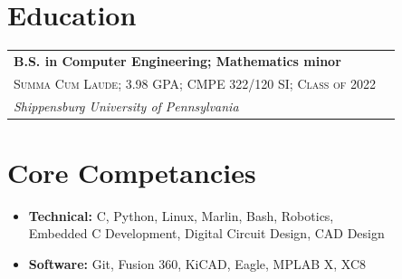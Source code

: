 \documentclass[
	10pt, %
]{FreemanCV}
\begin{document}



\begin{paracol}{2}

\section{Education} 


\begin{supertabular}{l l} %

	
	\textbf{B.S. in Computer Engineering; Mathematics minor}\\ %
	\small\textsc{Summa Cum Laude; 3.98 GPA; CMPE 322/120 SI; Class of 2022}\\ %
	\textit{Shippensburg University of Pennsylvania}\\ %
	

\end{supertabular}

\switchcolumn

\section{Core Competancies}

\begin{itemize}[leftmargin=10pt]
	\itemsep0pt
	\item \textbf{Technical:} C, Python, Linux, Marlin, Bash, Robotics,\\
	\hspace*{0pt}Embedded C Development, Digital Circuit Design, CAD Design
	\item \textbf{Software:} Git, Fusion 360, KiCAD, Eagle, MPLAB X, XC8
\end{itemize}



\end{paracol}
\end{document}
